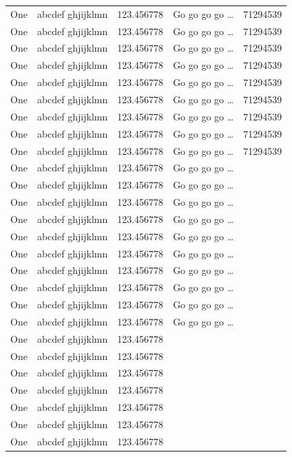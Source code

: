 \documentclass[phd]{ndsu-thesis-2022}
\begin{document}
\begin{longtable}{l l l l r}
One & abcdef ghjijklmn & 123.456778  & Go go go go \ldots & \num{71294539}\\
One & abcdef ghjijklmn & 123.456778  & Go go go go \ldots & \num{71294539}\\
One & abcdef ghjijklmn & 123.456778  & Go go go go \ldots & \num{71294539}\\
One & abcdef ghjijklmn & 123.456778  & Go go go go \ldots & \num{71294539}\\
One & abcdef ghjijklmn & 123.456778  & Go go go go \ldots & \num{71294539}\\
One & abcdef ghjijklmn & 123.456778  & Go go go go \ldots & \num{71294539}\\
One & abcdef ghjijklmn & 123.456778  & Go go go go \ldots & \num{71294539}\\
One & abcdef ghjijklmn & 123.456778  & Go go go go \ldots & \num{71294539}\\
One & abcdef ghjijklmn & 123.456778  & Go go go go \ldots & \num{71294539}\\
One & abcdef ghjijklmn & 123.456778  & Go go go go \ldots \\
One & abcdef ghjijklmn & 123.456778  & Go go go go \ldots \\
One & abcdef ghjijklmn & 123.456778  & Go go go go \ldots \\
One & abcdef ghjijklmn & 123.456778  & Go go go go \ldots \\
One & abcdef ghjijklmn & 123.456778  & Go go go go \ldots \\
One & abcdef ghjijklmn & 123.456778  & Go go go go \ldots \\
One & abcdef ghjijklmn & 123.456778  & Go go go go \ldots \\
One & abcdef ghjijklmn & 123.456778  & Go go go go \ldots \\
One & abcdef ghjijklmn & 123.456778  & Go go go go \ldots \\
One & abcdef ghjijklmn & 123.456778  & Go go go go \ldots \\
One & abcdef ghjijklmn & 123.456778 \\
One & abcdef ghjijklmn & 123.456778 \\
One & abcdef ghjijklmn & 123.456778 \\
One & abcdef ghjijklmn & 123.456778 \\
One & abcdef ghjijklmn & 123.456778 \\
One & abcdef ghjijklmn & 123.456778 \\
One & abcdef ghjijklmn & 123.456778 \\

\end{longtable}
\end{document}
